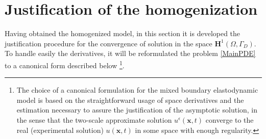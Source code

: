\section{Justification of the homogenization}
Having obtained the homogenized model, in this section it is developed the justification procedure for the convergence of solution in the space $\mathbf{H}^1(\Omega, \Gamma_D)$. To handle easily the derivatives, it will be reformulated the problem \ref{MainPDE} to a canonical form described below \footnote{The choice of a canonical formulation for the mixed boundary elastodynamic model is based on the straightforward usage of space derivatives and the estimation necessary to assure the justification of the asymptotic solution, in the sense that the two-scale approximate solution $u^{\epsilon}(\mathbf{x},t)$ converge to the real (experimental solution) $u(\mathbf{x},t)$ in some space with enough regularity.}.

